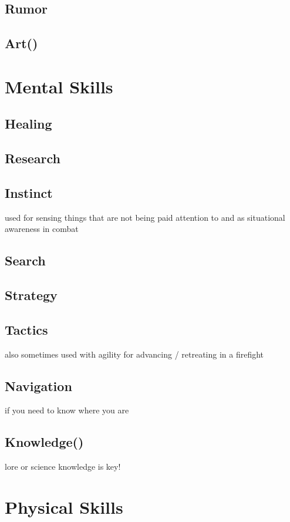 \subsection{Rumor}\label{subsec:rumor}
\subsection{Art()}\label{subsec:art}

\section{Mental Skills}\label{sec:wisdom-skills}
\subsection{Healing}\label{subsec:healing}
\subsection{Research}\label{subsec:research}
\subsection{Instinct}\label{subsec:instinct}
used for sensing things that are not being paid attention to and as situational awareness in combat
\subsection{Search}\label{subsec:search}
\subsection{Strategy}\label{subsec:strategy}
\subsection{Tactics}\label{subsec:tactics}
also sometimes used with agility for advancing / retreating in a firefight
\subsection{Navigation}\label{subsec:navigation}
if you need to know where you are
\subsection{Knowledge()}\label{subsec:knowledge}
lore or science knowledge is key!


\section{Physical Skills}\label{sec:strength-skills}
